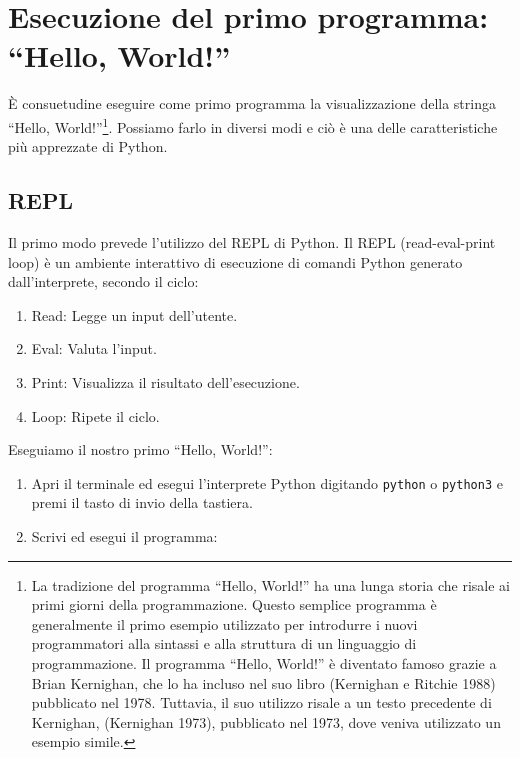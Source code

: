 \documentclass[
  letterpaper,
]{scrbook}
\providecommand{\tightlist}{%
  \setlength{\itemsep}{0pt}\setlength{\parskip}{0pt}}\usepackage{longtable,booktabs,array}
\begin{document}
\section{Esecuzione del primo programma: ``Hello,
World!''}\label{esecuzione-del-primo-programma-hello-world}

È consuetudine eseguire come primo programma la visualizzazione della
stringa ``Hello, World!''\footnote{La tradizione del programma ``Hello,
  World!'' ha una lunga storia che risale ai primi giorni della
  programmazione. Questo semplice programma è generalmente il primo
  esempio utilizzato per introdurre i nuovi programmatori alla sintassi
  e alla struttura di un linguaggio di programmazione. Il programma
  ``Hello, World!'' è diventato famoso grazie a Brian Kernighan, che lo
  ha incluso nel suo libro (Kernighan e Ritchie 1988) pubblicato nel
  1978. Tuttavia, il suo utilizzo risale a un testo precedente di
  Kernighan, (Kernighan 1973), pubblicato nel 1973, dove veniva
  utilizzato un esempio simile.}. Possiamo farlo in diversi modi e ciò è
una delle caratteristiche più apprezzate di Python.

\subsection{REPL}\label{repl}

Il primo modo prevede l'utilizzo del REPL di Python. Il REPL
(read-eval-print loop) è un ambiente interattivo di esecuzione di
comandi Python generato dall'interprete, secondo il ciclo:

\begin{enumerate}
\def\labelenumi{\arabic{enumi}.}
\tightlist
\item
  Read: Legge un input dell'utente.
\item
  Eval: Valuta l'input.
\item
  Print: Visualizza il risultato dell'esecuzione.
\item
  Loop: Ripete il ciclo.
\end{enumerate}

Eseguiamo il nostro primo ``Hello, World!'':

\begin{enumerate}
\def\labelenumi{\arabic{enumi}.}
\tightlist
\item
  Apri il terminale ed esegui l'interprete Python digitando
  \texttt{python} o \texttt{python3} e premi il tasto di invio della
  tastiera.
\item
  Scrivi ed esegui il programma:
\end{enumerate}
\end{document}
